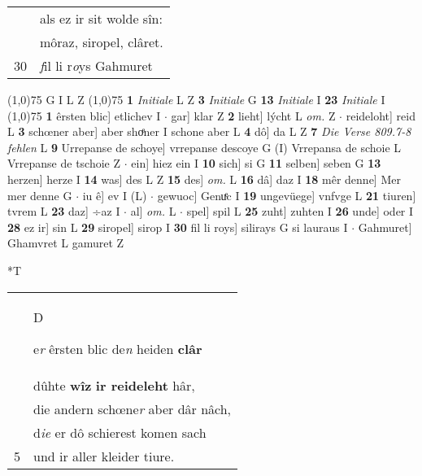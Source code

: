 \documentclass[8pt,a4paper,notitlepage]{article}
\begin{document}
\begin{table}[ht]
\begin{minipage}[t]{0.5\linewidth}
\begin{tabular}{rl}
 & als ez ir sit wolde sîn:\\ 
 & môraz, siropel, clâret.\\ 
30 & \textit{f}il li r\textit{o}ys Gahmuret\\ 
\end{tabular}
\scriptsize
\line(1,0){75} \newline
G I L Z \newline
\line(1,0){75} \newline
\textbf{1} \textit{Initiale} L Z  \textbf{3} \textit{Initiale} G  \textbf{13} \textit{Initiale} I  \textbf{23} \textit{Initiale} I  \newline
\line(1,0){75} \newline
\textbf{1} êrsten blic] etlichev I  $\cdot$ gar] klar Z \textbf{2} lieht] lýcht L \textit{om.} Z  $\cdot$ reideloht] reid L \textbf{3} schœner aber] aber shoͤner I schone aber L \textbf{4} dô] da L Z \textbf{7} \textit{Die Verse 809.7-8 fehlen} L  \textbf{9} Urrepanse de schoye] vrrepanse descoye G (I) Vrrepansa de schoie L Vrrepanse de tschoie Z  $\cdot$ ein] hiez ein I \textbf{10} sich] si G \textbf{11} selben] seben G \textbf{13} herzen] herze I \textbf{14} was] des L Z \textbf{15} des] \textit{om.} L \textbf{16} dâ] daz I \textbf{18} mêr denne] Mer mer denne G  $\cdot$ iu ê] ev I (L)  $\cdot$ gewuoc] Genuͤc I \textbf{19} ungevüege] vnfvge L \textbf{21} tiuren] tvrem L \textbf{23} daz] ÷az I  $\cdot$ al] \textit{om.} L  $\cdot$ spel] spil L \textbf{25} zuht] zuhten I \textbf{26} unde] oder I \textbf{28} ez ir] sin L \textbf{29} siropel] sirop I \textbf{30} fil li roys] silirays G si lauraus I  $\cdot$ Gahmuret] Ghamvret L gamuret Z \newline
\end{minipage}
\hspace{0.5cm}
\begin{minipage}[t]{0.5\linewidth}
\small
\begin{center}*T
\end{center}
\begin{tabular}{rl}
 & \begin{large}D\end{large}e\textit{r} êrsten blic de\textit{n} heiden \textbf{clâr}\\ 
 & dûhte \textbf{wîz} \textbf{ir reideleht} hâr,\\ 
 & die andern schœne\textit{r} aber dâr nâch,\\ 
 & d\textit{ie} er dô schierest komen sach\\ 
5 & und ir aller kleider tiure.\\ 

\end{tabular}
\end{minipage}
\end{table}
\end{document}
